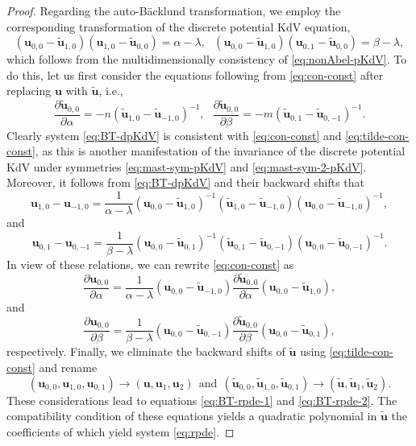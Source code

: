 \documentclass[dvips,10pt]{article}
\newcommand{\bs}{\boldsymbol}
\newcommand{\bsu}{ {\bs{u}}}
\theoremstyle{remark} %
\begin{document}
\begin{proof}
		Regarding the auto-B\"acklund transformation, we employ the corresponding transformation of the discrete potential KdV equation,
		\begin{equation} \label{eq:BT-dpKdV}
			\left({\bs{u}}_{0,0} - \tilde{\bs{u}}_{1,0}\right) \left( {\bs{u}}_{1,0}-\tilde{\bs{u}}_{0,0}\right) = \alpha - \lambda, ~~~ 	\left({\bs{u}}_{0,0} - \tilde{\bs{u}}_{1,0}\right) \left( {\bs{u}}_{0,1}-\tilde{\bs{u}}_{0,0}\right) = \beta - \lambda,
		\end{equation}
		which follows from the multidimensionally consistency of \eqref{eq:nonAbel-pKdV}. To do this, let us first consider the equations following from \eqref{eq:con-const} after replacing $\bsu$ with $\tilde{\bsu}$, i.e.,
		\begin{equation} \label{eq:tilde-con-const}
		\frac{\partial \tilde{\bs{u}}_{0,0}}{\partial \alpha} =  -n \left(\tilde{\bs{u}}_{1,0} -\tilde{\bs{u}}_{-1,0}\right)^{-1}, ~~~ 	\frac{\partial \tilde{\bs{u}}_{0,0}}{\partial \beta} =  -m \left(\tilde{\bs{u}}_{0,1} - \tilde{\bs{u}}_{0,-1}\right)^{-1}.
		\end{equation}
		Clearly system \eqref{eq:BT-dpKdV} is consistent with \eqref{eq:con-const} and \eqref{eq:tilde-con-const}, as this is another manifestation of the invariance of the discrete potential KdV under symmetries \eqref{eq:mast-sym-pKdV} and \eqref{eq:mast-sym-2-pKdV}. Moreover, it follows from \eqref{eq:BT-dpKdV} and their backward shifts that
		$$ \bsu_{1,0}-\bsu_{-1,0} = \frac{1}{\alpha - \lambda} (\bsu_{0,0} - \tilde{\bsu}_{1,0})^{-1} (\tilde{\bsu}_{1,0}-\tilde{\bsu}_{-1,0}) (\bsu_{0,0} -\tilde{\bsu}_{-1,0})^{-1},$$
		and
		$$\bsu_{0,1}-\bsu_{0,-1} = \frac{1}{\beta - \lambda} (\bsu_{0,0} - \tilde{\bsu}_{0,1})^{-1} (\tilde{\bsu}_{0,1}-\tilde{\bsu}_{0,-1}) (\bsu_{0,0} -\tilde{\bsu}_{0,-1})^{-1}.$$
		In view of these relations, we can rewrite \eqref{eq:con-const} as 
		$$ \frac{\partial \bsu_{0,0}}{\partial \alpha} = \frac{1}{\alpha - \lambda} (\bsu_{0,0} -\tilde{\bsu}_{-1,0}) \frac{\partial \tilde{\bsu}_{0,0}}{\partial \alpha} (\bsu_{0,0} - \tilde{\bsu}_{1,0}),$$
		and
		$$\frac{\partial \bsu_{0,0}}{\partial \beta} = \frac{1}{\beta - \lambda} (\bsu_{0,0} -\tilde{\bsu}_{0,-1}) \frac{\partial \tilde{\bsu}_{0,0}}{\partial \beta} (\bsu_{0,0} - \tilde{\bsu}_{0,1}),$$
		respectively. Finally, we eliminate the backward shifts of $\tilde{\bsu}$ using \eqref{eq:tilde-con-const} and rename
		$$ (\bsu_{0,0}, \bsu_{1,0}, \bsu_{0,1}) \longrightarrow (\bsu,\bsu_1,\bsu_2) ~~ {\mbox{and}} ~~  (\tilde{\bsu}_{0,0}, \tilde{\bsu}_{1,0}, \tilde{\bsu}_{0,1}) \longrightarrow (\tilde{\bsu},\tilde{\bsu}_1,\tilde{\bsu}_2).$$
		These considerations lead to equations \eqref{eq:BT-rpde-1} and \eqref{eq:BT-rpde-2}. The compatibility condition of these equations yields a quadratic polynomial in $\tilde{\bsu}$ the coefficients of which yield system \eqref{eq:rpde}.
	\end{proof}
	
\end{document}

